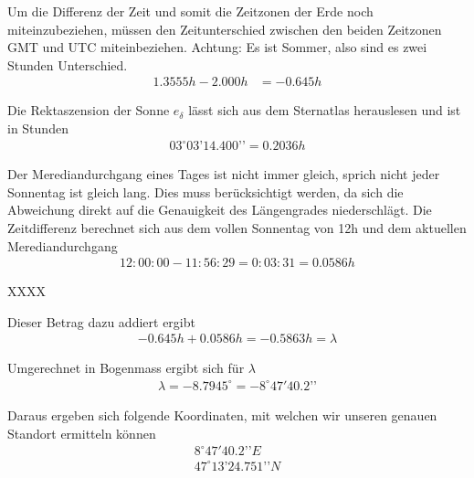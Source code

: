 \begin{refsection}
Um die Differenz der Zeit und somit die Zeitzonen der Erde noch miteinzubeziehen, müssen den Zeitunterschied zwischen den beiden Zeitzonen GMT und UTC miteinbeziehen. Achtung: Es ist Sommer, also sind es zwei Stunden Unterschied.
\begin{align*}
1.3555h - 2.000h &= -0.645h
\end{align*}

Die Rektaszension der Sonne $e_\delta$ lässt sich aus dem Sternatlas herauslesen und ist in Stunden
\begin{align*}
03^{\circ} 03’ 14.400’’ = 0.2036h
\end{align*}

Der Merediandurchgang eines Tages ist nicht immer gleich, sprich nicht jeder Sonnentag ist gleich lang. Dies muss berücksichtigt werden, da sich die Abweichung direkt auf die Genauigkeit des Längengrades niederschlägt.
Die Zeitdifferenz berechnet sich aus dem vollen Sonnentag von 12h und dem aktuellen Merediandurchgang
\begin{align*}
12:00:00 - 11:56:29 = 0:03:31 = 0.0586 h
\end{align*}




XXXX




Dieser Betrag dazu addiert ergibt
\begin{align*}
-0.645 h + 0.0586 h = - 0.5863 h = \lambda
\end{align*}

Umgerechnet in Bogenmass ergibt sich für $\lambda$
\begin{align*}
\lambda = - 8.7945^{\circ} = -8^{\circ} 47' 40.2’’
\end{align*}

Daraus ergeben sich folgende Koordinaten, mit welchen wir unseren genauen Standort ermitteln können
\begin{align*}
8^{\circ}47' 40.2’’ E \\
47^{\circ}13’ 24.751’’ N
\end{align*}




\printbibliography[heading=subbibliography]
\end{refsection}







